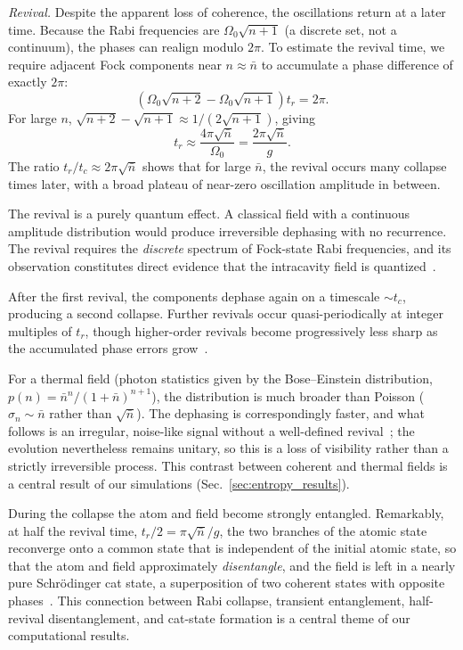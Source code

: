 \documentclass{iopjournal}
\begin{document}
\textit{Revival.} Despite the apparent loss of coherence, the oscillations return at a later time. Because the Rabi frequencies are $\Omega_0\sqrt{n+1}$ (a discrete set, not a continuum), the phases can realign modulo $2\pi$. To estimate the revival time, we require adjacent Fock components near $n \approx \bar{n}$ to accumulate a phase difference of exactly $2\pi$:
\begin{equation}
\left(\Omega_0\sqrt{n+2} - \Omega_0\sqrt{n+1}\right) t_r = 2\pi.
\end{equation}
For large $n$, $\sqrt{n+2} - \sqrt{n+1} \approx 1/(2\sqrt{n+1})$, giving
\begin{equation}
t_r \approx \frac{4\pi\sqrt{\bar{n}}}{\Omega_0} = \frac{2\pi\sqrt{\bar{n}}}{g}.
\label{eq:t_revival}
\end{equation}
The ratio $t_r/t_c \approx 2\pi\sqrt{\bar{n}}$ shows that for large $\bar{n}$, the revival occurs many collapse times later, with a broad plateau of near-zero oscillation amplitude in between.

The revival is a purely quantum effect. A classical field with a continuous amplitude distribution would produce irreversible dephasing with no recurrence. The revival requires the \textit{discrete} spectrum of Fock-state Rabi frequencies, and its observation constitutes direct evidence that the intracavity field is quantized~\cite{eberly1980, haroche2006}.

After the first revival, the components dephase again on a timescale $\sim t_c$, producing a second collapse. Further revivals occur quasi-periodically at integer multiples of $t_r$, though higher-order revivals become progressively less sharp as the accumulated phase errors grow~\cite{gerry2004}.

For a thermal field (photon statistics given by the Bose--Einstein distribution, $p(n) = \bar{n}^n/(1+\bar{n})^{n+1}$), the distribution is much broader than Poisson ($\sigma_n \sim \bar{n}$ rather than $\sqrt{\bar{n}}$). The dephasing is correspondingly faster, and what follows is an irregular, noise-like signal without a well-defined revival~\cite{knight1982}; the evolution nevertheless remains unitary, so this is a loss of visibility rather than a strictly irreversible process. This contrast between coherent and thermal fields is a central result of our simulations (Sec.~\ref{sec:entropy_results}).

During the collapse the atom and field become strongly entangled. Remarkably, at half the revival time, $t_r/2 = \pi\sqrt{\bar{n}}/g$, the two branches of the atomic state reconverge onto a common state that is independent of the initial atomic state, so that the atom and field approximately \emph{disentangle}, and the field is left in a nearly pure Schr\"{o}dinger cat state, a superposition of two coherent states with opposite phases~\cite{gea-banacloche1990, gea-banacloche1991, phoenix1991}. This connection between Rabi collapse, transient entanglement, half-revival disentanglement, and cat-state formation is a central theme of our computational results.
\end{document}
